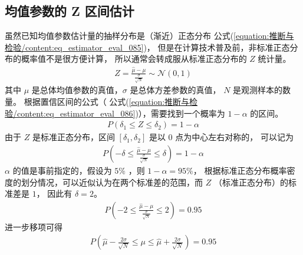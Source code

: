 \documentclass[letterpaper,10pt,english]{sphinxmanual}
\begin{document}
\subsection{均值参数的 Z 区间估计}
\label{\detokenize{_u63a8_u65ad_u4e0e_u68c0_u9a8c/content:z}}
虽然已知均值参数估计量的抽样分布是（渐近）正态分布 公式(\ref{equation:推断与检验/content:eq_estimator_eval_085})，
但是在计算技术普及前，非标准正态分布的概率值不是很方便计算，
所以通常会转成服从标准正态分布的 \(Z\) 统计量。
\begin{equation}\label{equation:推断与检验/content:eq_estimator_eval_085}
\begin{split}Z = \frac{\hat{\mu} - \mu}{ \frac{\sigma}{\sqrt{N}}  } \sim \mathcal{N}(0,1)\end{split}
\end{equation}
其中 \(\mu\) 是总体均值参数的真值，\(\sigma\) 是总体方差参数的真值，
\(N\) 是观测样本的数量。
根据置信区间的公式（ 公式(\ref{equation:推断与检验/content:eq_estimator_eval_086})），需要找到一个概率为 \(1-\alpha\)
的区间。
\begin{equation}\label{equation:推断与检验/content:推断与检验/content:74}
\begin{split}P( \delta_1 \leq Z \leq \delta_2 ) = 1-\alpha\end{split}
\end{equation}
由于 \(Z\) 是标准正态分布，区间 \([\delta_1,\delta_2]\) 是以 \(0\) 点为中心左右对称的，
可以记为
\begin{equation}\label{equation:推断与检验/content:推断与检验/content:75}
\begin{split}P( -\delta \leq \frac{\hat{\mu} - \mu}{ \frac{\sigma}{\sqrt{N}}} \leq \delta ) = 1-\alpha\end{split}
\end{equation}
\(\alpha\) 的值是事前指定的，假设为 \(5\%\)
，则 \(1-\alpha=95\%\)，
根据标准正态分布概率密度的划分情况，可以近似认为在两个标准差的范围，而 \(Z\) （标准正态分布）的标准差是 \(1\)，
因此有 \(\delta=2\)。
\begin{equation}\label{equation:推断与检验/content:推断与检验/content:76}
\begin{split}P( -2 \leq \frac{\hat{\mu} - \mu}{ \frac{\sigma}{\sqrt{N}}} \leq 2) =  0.95\end{split}
\end{equation}
进一步移项可得
\begin{equation}\label{equation:推断与检验/content:推断与检验/content:77}
\begin{split}P( \hat{\mu} - \frac{2\sigma}{\sqrt{N}}  \leq \mu \leq \hat{\mu} + \frac{2\sigma}{\sqrt{N}}) =  0.95\end{split}
\end{equation}
\end{document}
